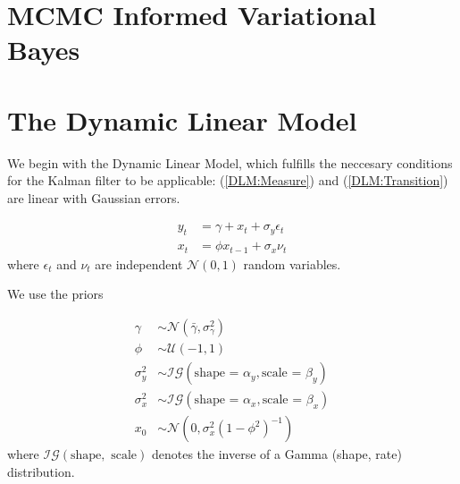 \documentclass[12pt,a4paper]{article}%
\numberwithin{equation}{section}
\begin{document}
\section{MCMC Informed Variational Bayes}

\section{The Dynamic Linear Model}

We begin with the Dynamic Linear Model, which fulfills the neccesary conditions for the Kalman filter to be applicable: (\ref{DLM:Measure}) and (\ref{DLM:Transition}) are linear with Gaussian errors.

\begin{align}
y_t &= \gamma + x_t + \sigma_y \epsilon_t \label{DLM:Measure}\\
x_t &= \phi x_{t-1} + \sigma_x \nu_t \label{DLM:Transition}
\end{align}
where $\epsilon_t$ and $\nu_t$ are independent $\mathcal{N}(0, 1)$ random variables.

We use the priors

\begin{align}
\gamma &\sim \mathcal{N}(\bar{\gamma}, \sigma^2_{\gamma}) \\
\phi &\sim \mathcal{U}(-1, 1) \\
\sigma^2_y &\sim \mathcal{IG}(\mbox{shape = }\alpha_y, \mbox{scale = }\beta_y) \\
\sigma^2_x &\sim \mathcal{IG}(\mbox{shape = }\alpha_x, \mbox{scale = }\beta_x) \\
x_0 &\sim \mathcal{N}(0, \sigma^2_x(1 - \phi^2)^{-1})
\end{align}
where $\mathcal{IG}(\mbox{shape}, \mbox{ scale})$ denotes the inverse of a Gamma (shape, rate) distribution.
\end{document}
